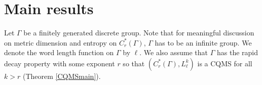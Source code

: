 \documentclass[a4paper,11pt,reqno]{amsart}
\theoremstyle{plain}
\newtheorem{thm}{Theorem}[section]
\newtheorem{lem}[thm]{Lemma}
\newtheorem{rem}[thm]{Remark}
\theoremstyle{mainthmstyle}
\theoremstyle{named}
\numberwithin{equation}{section}
\newcommand{\Bea}{\begin{eqnarray*}}
\newcommand{\Eea}{\end{eqnarray*}}
\begin{document}
\section{Main results}
Let $\Gamma$ be a finitely generated discrete group. Note that for meaningful discussion on metric dimension and entropy on $C^{\ast}_{r}(\Gamma)$, $\Gamma$ has to be an infinite group. We denote the word length function on $\Gamma$ by $\ell$. We also assume that $\Gamma$ has the rapid decay property with some exponent $r$ so that $(C^{\ast}_{r}(\Gamma),L^{k}_{\ell})$ is a CQMS for all $k>r$ (Theorem \ref{CQMSmain}). %

\end{document}
